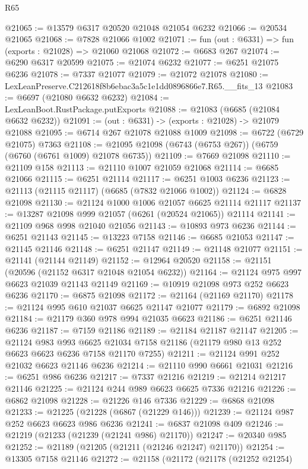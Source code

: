 \begin{lexlean}{R65}
\begin{coremodule}
{@21065 := @13579 @6317 @20520 @21048 @21054 @6232
@21066 := @20534 @21065
@21068 := @7828 @21066 @1002
@21071 := fun (out : @6331) => fun (exports : @21028) => @21060 @21068
@21072 := @6683 @267
@21074 := @6290 @6317 @20599
@21075 := @21074 @6232
@21077 := @6251 @21075 @6236
@21078 := @7337 @21077
@21079 := @21072 @21078
@21080 := LexLeanPreserve.C212618f8b6ebac3a5c1e1dd0896866e7.R65.__fits_13
@21083 := @6697 (@21080 @6632 @6232)
@21084 := LexLeanBoot.RustPackage.putExports
@21088 := @21083 (@6685 (@21084 @6632 @6232))
@21091 := (out : @6331) -> (exports : @21028) -> @21079 @21088
@21095 := @6714 @267 @21078 @21088 @1009
@21098 := @6722 (@6729 @21075) @7363
@21108 := @21095 @21098 (@6743 (@6753 @267)) (@6759 (@6760 (@6761 @1009) @21078 @6735))
@21109 := @7669 @21098
@21110 := @21109 @158
@21113 := @21110 @1007 @21059 @21068
@21114 := @6685 @21066
@21115 := @6251 @21114
@21117 := @6251 @1003 @6236
@21123 := @21113 (@21115 @21117) (@6685 (@7832 @21066 @1002))
@21124 := @6828 @21098
@21130 := @21124 @1000 @1006 @21057 @6625 @21114 @21117
@21137 := @13287 @21098 @999 @21057 (@6261 (@20524 @21065)) @21114
@21141 := @21109 @968 @998 @21040 @21056
@21143 := @10893 @973 @6236
@21144 := @6251 @21143
@21145 := @13223 @7158
@21146 := @6685 @21053
@21147 := @21145 @21146
@21148 := @6251 @21147
@21149 := @21148 @21077
@21151 := @21141 (@21144 @21149)
@21152 := @12964 @20520
@21158 := @21151 (@20596 (@21152 @6317 @21048 @21054 @6232))
@21164 := @21124 @975 @997 @6623 @21039 @21143 @21149
@21169 := @10919 @21098 @973 @252 @6623 @6236
@21170 := @6875 @21098
@21172 := @21164 (@21169 @21170)
@21178 := @21124 @995 @610 @21037 @6625 @21147 @21077
@21179 := @6892 @21098
@21184 := @21179 @360 @978 @994 @21035 @6623
@21186 := @6251 @21146 @6236
@21187 := @7159 @21186
@21189 := @21184 @21187 @21147
@21205 := @21124
    @983
    @993
    @6625
    @21034
    @7158
    @21186
    (@21179 @980 @13 @252 @6623 @6623 @6236 @7158 @21170 @7255)
@21211 := @21124 @991 @252 @21032 @6623 @21146 @6236
@21214 := @21110 @990 @6661 @21031
@21216 := @6251 @986 @6236
@21217 := @7337 @21216
@21219 := @21214 @21217 @21146
@21225 := @21124 @244 @989 @6623 @6625 @7336 @21216
@21226 := @6862 @21098
@21228 := @21226 @146 @7336
@21229 := @6868 @21098
@21233 := @21225 (@21228 (@6867 (@21229 @146)))
@21239 := @21124 @987 @252 @6623 @6623 @986 @6236
@21241 := @6837 @21098 @409
@21246 := @21219 (@21233 (@21239 (@21241 @986) @21170))
@21247 := @20340 @985
@21252 := @21189 (@21205 (@21211 (@21246 @21247) @21170))
@21254 := @13305 @7158 @21146
@21272 := @21158
    (@21172
      (@21178
        (@21252 @21254)
}
\end{coremodule}
\end{lexlean}
